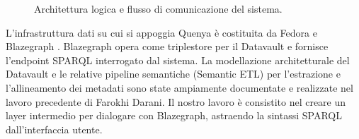 \begin{figure}[htbp]
{
    }
    \caption{Architettura logica e flusso di comunicazione del sistema. 
    }\label{fig:arch_logica}
  \end{figure}

  L'infrastruttura dati su cui si appoggia Quenya è costituita da Fedora
   e Blazegraph . 
  Blazegraph opera come triplestore per il Datavault e fornisce l'endpoint SPARQL interrogato dal sistema. La modellazione architetturale del Datavault e le relative pipeline semantiche (Semantic ETL) per l'estrazione e l'allineamento dei metadati sono state ampiamente documentate e realizzate nel lavoro precedente di Farokhi Darani\cite{Far25}.
  Il nostro lavoro è consistito nel creare un layer intermedio per dialogare con Blazegraph, astraendo la sintassi SPARQL dall'interfaccia utente.
\newpage
